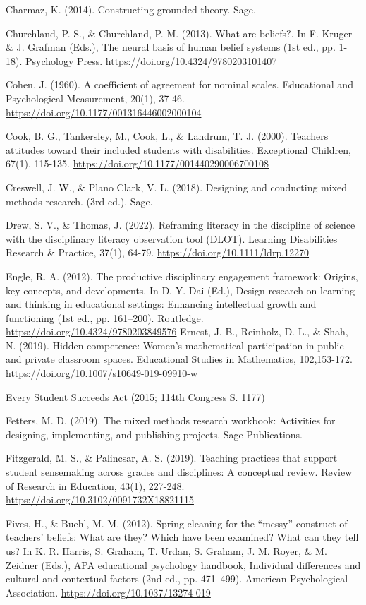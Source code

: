\documentclass{sig-alternate} %
\begin{document}
Charmaz, K. (2014). Constructing grounded theory. Sage.

Churchland, P. S., \& Churchland, P. M. (2013). What are beliefs?. In F. Kruger \& J. Grafman (Eds.), The neural basis of human belief systems (1st ed., pp. 1-18). Psychology Press. \url{https://doi.org/10.4324/9780203101407}

Cohen, J. (1960). A coefficient of agreement for nominal scales. Educational and Psychological Measurement, 20(1), 37-46. \url{https://doi.org/10.1177/001316446002000104}

Cook, B. G., Tankersley, M., Cook, L., \& Landrum, T. J. (2000). Teachers attitudes toward their included students with disabilities. Exceptional Children, 67(1), 115-135. \url{https://doi.org/10.1177/001440290006700108}

Creswell, J. W., \& Plano Clark, V. L. (2018). Designing and conducting mixed methods research. (3rd ed.). Sage.

Drew, S. V., \& Thomas, J. (2022). Reframing literacy in the discipline of science with the disciplinary literacy observation tool (DLOT). Learning Disabilities Research \& Practice, 37(1), 64-79. \url{https://doi.org/10.1111/ldrp.12270}

Engle, R. A. (2012). The productive disciplinary engagement framework: Origins, key concepts, and developments. In D. Y. Dai (Ed.), Design research on learning and thinking in educational settings: Enhancing intellectual growth and functioning (1st ed., pp. 161–200). Routledge. \url{https://doi.org/10.4324/9780203849576}
\newpage
Ernest, J. B., Reinholz, D. L., \& Shah, N. (2019). Hidden competence: Women’s mathematical participation in public and private classroom spaces. Educational Studies in Mathematics, 102,153-172. \url{https://doi.org/10.1007/s10649-019-09910-w}

Every Student Succeeds Act (2015; 114th Congress S. 1177)

Fetters, M. D. (2019). The mixed methods research workbook: Activities for designing, implementing, and publishing projects. Sage Publications.

Fitzgerald, M. S., \& Palincsar, A. S. (2019). Teaching practices that support student sensemaking across grades and disciplines: A conceptual review. Review of Research in Education, 43(1), 227-248. \url{https://doi.org/10.3102/0091732X18821115}

Fives, H., \& Buehl, M. M. (2012). Spring cleaning for the “messy” construct of teachers’ beliefs: What are they? Which have been examined? What can they tell us? In K. R. Harris, S. Graham, T. Urdan, S. Graham, J. M. Royer, \& M. Zeidner (Eds.), APA educational psychology handbook, Individual differences and cultural and contextual factors (2nd ed., pp. 471–499). American Psychological Association. \url{https://doi.org/10.1037/13274-019}
\end{document}
